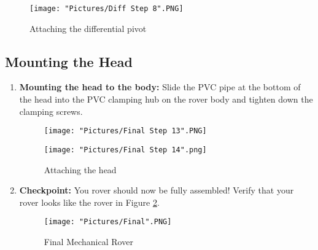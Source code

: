 \documentclass{article}
\begin{document}
\begin{enumerate}
\begin{figure}[H]
  \centering
  \begin{minipage}[b]{0.35\textwidth}
      \texttt{[image: "Pictures/Diff Step 8".PNG]}
  \end{minipage}
  \caption{Attaching the differential pivot}
  \label{attaching diff pvt}
\end{figure}

\end{enumerate}

\subsection{Mounting the Head}

\begin{enumerate}

\item \textbf{Mounting the head to the body:} Slide the PVC pipe at the bottom of the head into the PVC clamping hub on the rover body and tighten down the clamping screws.

\begin{figure}[H]
  \centering
  \begin{minipage}[b]{0.45\textwidth}
    \texttt{[image: "Pictures/Final Step 13".PNG]}
  \end{minipage}
  \hfill
  \begin{minipage}[b]{0.45\textwidth}
    \texttt{[image: "Pictures/Final Step 14".png]}
  \end{minipage}
  \caption{Attaching the head}
\end{figure}

\item \textbf{Checkpoint:} You rover should now be fully assembled!  Verify that your rover looks like the rover in Figure \ref{final mechanical rover}.
\begin{figure}[H]
  \centering
    \texttt{[image: "Pictures/Final".PNG]}
  \caption{Final Mechanical Rover}
  \label{final mechanical rover}
\end{figure}

\end{enumerate}
\end{document}
